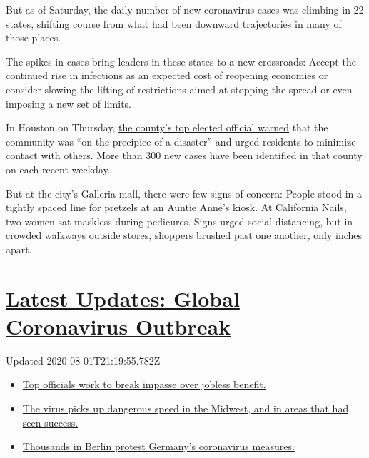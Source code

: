 But as of Saturday, the daily number of new coronavirus cases was
climbing in 22 states, shifting course from what had been downward
trajectories in many of those places.

The spikes in cases bring leaders in these states to a new crossroads:
Accept the continued rise in infections as an expected cost of reopening
economies or consider slowing the lifting of restrictions aimed at
stopping the spread or even imposing a new set of limits.

In Houston on Thursday,
\href{https://www.houstonchronicle.com/news/houston-texas/houston/article/Hidalgo-to-announce-COVID-19-threat-level-15332940.php}{the
county's top elected official warned} that the community was ``on the
precipice of a disaster'' and urged residents to minimize contact with
others. More than 300 new cases have been identified in that county on
each recent weekday.

But at the city's Galleria mall, there were few signs of concern: People
stood in a tightly spaced line for pretzels at an Auntie Anne's kiosk.
At California Nails, two women sat maskless during pedicures. Signs
urged social distancing, but in crowded walkways outside stores,
shoppers brushed past one another, only inches apart.

\hypertarget{latest-updates-global-coronavirus-outbreak}{%
\section{\texorpdfstring{\href{https://www.nytimes.com/2020/08/01/world/coronavirus-covid-19.html?action=click\&pgtype=Article\&state=default\&region=MAIN_CONTENT_1\&context=storylines_live_updates}{Latest
Updates: Global Coronavirus
Outbreak}}{Latest Updates: Global Coronavirus Outbreak}}\label{latest-updates-global-coronavirus-outbreak}}

Updated 2020-08-01T21:19:55.782Z

\begin{itemize}
\tightlist
\item
  \href{https://www.nytimes.com/2020/08/01/world/coronavirus-covid-19.html?action=click\&pgtype=Article\&state=default\&region=MAIN_CONTENT_1\&context=storylines_live_updates\#link-3ac56579}{Top
  officials work to break impasse over jobless benefit.}
\item
  \href{https://www.nytimes.com/2020/08/01/world/coronavirus-covid-19.html?action=click\&pgtype=Article\&state=default\&region=MAIN_CONTENT_1\&context=storylines_live_updates\#link-8796723}{The
  virus picks up dangerous speed in the Midwest, and in areas that had
  seen success.}
\item
  \href{https://www.nytimes.com/2020/08/01/world/coronavirus-covid-19.html?action=click\&pgtype=Article\&state=default\&region=MAIN_CONTENT_1\&context=storylines_live_updates\#link-25930521}{Thousands
  in Berlin protest Germany's coronavirus measures.}
\end{itemize}

